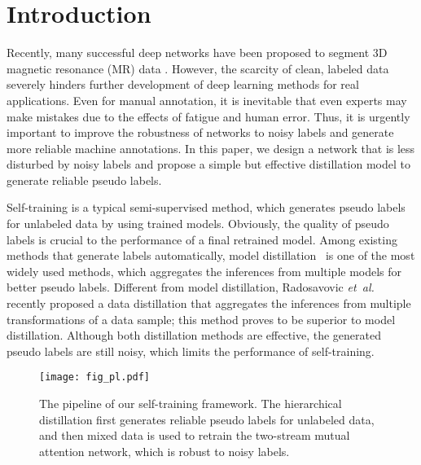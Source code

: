 \documentclass[letterpaper]{article} %
\begin{document}
\section{Introduction}\label{sec:intro}
Recently, many successful deep networks have been proposed to segment 3D magnetic resonance (MR) data \cite{Yu2017,Tseng_2017_CVPR,Cicek2016,Yu2017,Yu2017a}.
However, the scarcity of clean, labeled data severely hinders further development of deep learning methods for real applications.
Even for manual annotation, it is inevitable that even experts may make mistakes due to the effects of fatigue and human error.
Thus, it is urgently important to improve the robustness of networks to noisy labels and generate more reliable machine annotations.
In this paper, we design a network that is less disturbed by noisy labels and propose a simple but effective distillation model to generate reliable pseudo labels.

Self-training is a typical semi-supervised method, which generates pseudo labels for unlabeled data by using trained models.
Obviously, the quality of pseudo labels is crucial to the performance of a final retrained model.
Among existing methods that generate labels automatically, model distillation~\cite{Hansen1990,Gupta2016} is one of the most widely used methods, which aggregates the inferences from multiple models for better pseudo labels.
Different from model distillation, Radosavovic \emph{et~al.} recently proposed a data distillation that aggregates the inferences from multiple transformations of a data sample; this method proves to be superior to model distillation.
Although both distillation methods are effective, the generated pseudo labels are still noisy, which limits the performance of self-training.

\begin{figure}[t]
	\begin{center}
		\texttt{[image: fig\_pl.pdf]}
	\end{center}
	\caption{The pipeline of our self-training framework. The hierarchical distillation first generates reliable pseudo labels for unlabeled data, and then mixed data is used to retrain the two-stream mutual attention network, which is robust to noisy labels. }
	\label{fig:pl}
\end{figure}
\end{document}
